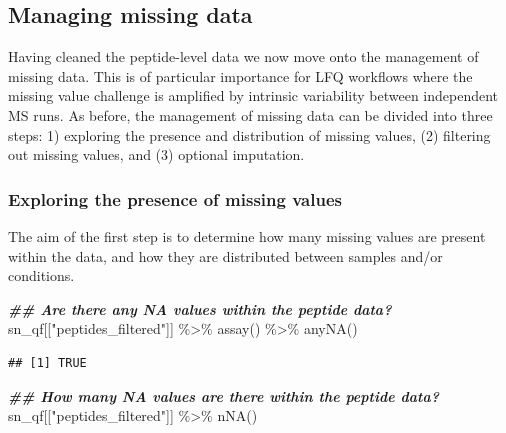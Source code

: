 \documentclass[9pt,a4paper,]{extarticle}
\newenvironment{Shaded}{\begin{snugshade}}{\end{snugshade}}
\newcommand{\DocumentationTok}[1]{\textcolor[rgb]{0.56,0.35,0.01}{\textbf{\textit{#1}}}}
\newcommand{\FunctionTok}[1]{\textcolor[rgb]{0.00,0.00,0.00}{#1}}
\newcommand{\NormalTok}[1]{#1}
\newcommand{\SpecialCharTok}[1]{\textcolor[rgb]{0.00,0.00,0.00}{#1}}
\newcommand{\StringTok}[1]{\textcolor[rgb]{0.31,0.60,0.02}{#1}}
\begin{document}
\hypertarget{managing-missing-data-1}{%
\subsection{Managing missing data}\label{managing-missing-data-1}}

Having cleaned the peptide-level data we now move onto the management of missing
data. This is of particular importance for LFQ workflows where the missing value
challenge is amplified by intrinsic variability between independent MS runs. As
before, the management of missing data can be divided into three steps: 1)
exploring the presence and distribution of missing values, (2) filtering out
missing values, and (3) optional imputation.

\hypertarget{exploring-the-presence-of-missing-values-1}{%
\subsubsection{Exploring the presence of missing values}\label{exploring-the-presence-of-missing-values-1}}

The aim of the first step is to determine how many missing values are present
within the data, and how they are distributed between samples and/or conditions.

\begin{Shaded}
\begin{Highlighting}[]
\DocumentationTok{\#\# Are there any NA values within the peptide data?}
\NormalTok{sn\_qf[[}\StringTok{"peptides\_filtered"}\NormalTok{]] }\SpecialCharTok{\%\textgreater{}\%}
  \FunctionTok{assay}\NormalTok{() }\SpecialCharTok{\%\textgreater{}\%}
  \FunctionTok{anyNA}\NormalTok{()}
\end{Highlighting}
\end{Shaded}

\begin{verbatim}
## [1] TRUE
\end{verbatim}

\begin{Shaded}
\begin{Highlighting}[]
\DocumentationTok{\#\# How many NA values are there within the peptide data?}
\NormalTok{sn\_qf[[}\StringTok{"peptides\_filtered"}\NormalTok{]] }\SpecialCharTok{\%\textgreater{}\%}
  \FunctionTok{nNA}\NormalTok{()}
\end{Highlighting}
\end{Shaded}
\end{document}
